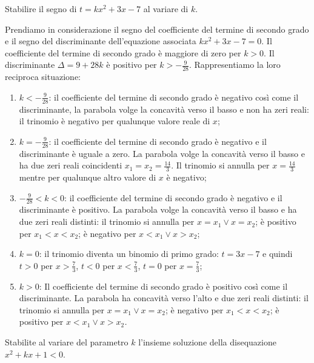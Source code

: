 \begin{exrig}
\begin{esempio}
Stabilire il segno di $t=kx^2+3x-7$ al variare di $ k $.

Prendiamo in considerazione il segno del coefficiente del termine di secondo grado e il segno del discriminante dell'equazione associata $kx^2+3x-7=0$. Il coefficiente del termine di secondo grado è maggiore di zero per $k>0$. Il discriminante $\Delta =9+28k$ è positivo per $k>-\frac 9{28}$. Rappresentiamo la loro reciproca situazione:
\begin{center}
 
\end{center}
\begin{enumerate}[label=(\Alph*)]
\item $k<-\frac 9{28}$: il coefficiente del termine di secondo grado è negativo così come il discriminante, la parabola volge la concavità verso il basso e non ha zeri reali: il trinomio è negativo per qualunque valore reale di $x$;
\item $k=-\frac 9{28}$: il coefficiente del termine di secondo grado è negativo e il discriminante è uguale a zero. La parabola volge la concavità verso il basso e ha due zeri reali coincidenti $x_1=x_2=\frac{14} 3$. Il trinomio si annulla per $x=\frac{14} 3$ mentre per qualunque altro valore di $x$ è negativo;
\item $-\frac 9{28}<k<0$: il coefficiente del termine di secondo grado è negativo e il discriminante è positivo. La parabola volge la concavità verso il basso e ha due zeri reali distinti: il trinomio si annulla per $x=x_1\vee x=x_2$; è positivo per $x_1<x<x_2$; è negativo per $x<x_1\vee x>x_2$;
\item $k=0$: il trinomio diventa un binomio di primo grado: $t=3x-7$ e quindi $t>0$ per $x>\frac 7 3$, $t<0$ per $x<\frac 7 3$, $t=0$ per $x=\frac 7 3$;
\item $k>0$: Il coefficiente del termine di secondo grado è positivo così come il discriminante. La parabola ha concavità verso l'alto e due zeri reali distinti: il trinomio si annulla per $x=x_1\vee x=x_2$; è negativo per $x_1<x<x_2$; è positivo per $x<x_1\vee x>x_2$\emph{.}
\end{enumerate}
\end{esempio}

\begin{esempio}
Stabilite al variare del parametro $k$ l'insieme soluzione della disequazione $x^2+kx+1<0$.


\end{esempio}
\end{exrig}
